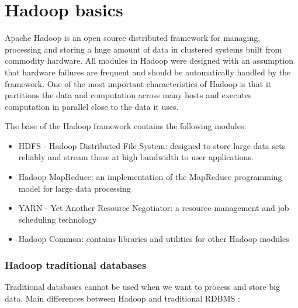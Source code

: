 \chapter{Hadoop basics}
Apache Hadoop is an open source distributed framework for managing, processing  and storing a huge amount of data in clustered systems built from commodity hardware. All modules in Hadoop were designed with an assumption that hardware failures are frequent and should be automatically handled by the framework. One of the most important characteristics of Hadoop is that it partitions the data and computation across many hosts and executes computation in parallel close to the data it uses.  \cite{Hadoop-wiki}

\noindent The base of the Hadoop framework contains the following modules:
\begin{itemize}
	\item HDFS - Hadoop Distributed File System: designed to store large data sets reliably and stream those at high bandwidth to user applications.
	\item Hadoop MapReduce: an implementation of the MapReduce programming model for large data processing
	\item YARN - Yet Another Resource Negotiator: a resource management and job scheduling technology
	\item Hadoop Common: contains libraries and utilities for other Hadoop modules
\end{itemize}
\iffalse\subsection{Hadoop \vs traditional databases}
Traditional databases cannot be used when we want to process and store big data. Main differences between Hadoop and traditional RDBMS \cite{Hadoop-vs-RDBMS}:
